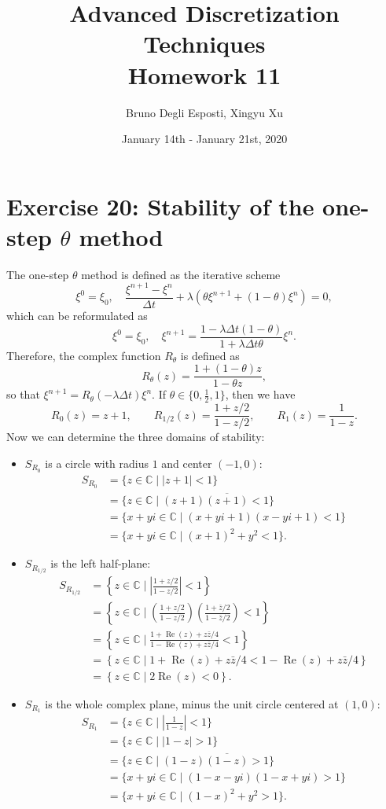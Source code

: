 \documentclass[a4paper]{article}
\title{\huge{Advanced Discretization Techniques \\ Homework 11}}
\author{\Large{Bruno Degli Esposti, Xingyu Xu}}
\date{January 14th - January 21st, 2020}
\newcommand{\abs}[1]{\left\lvert #1 \right\rvert}
\newcommand{\C}{\mathbb{C}}
\renewcommand{\Re}{\operatorname{Re}}
\begin{document}
\maketitle

\section*{Exercise 20: Stability of the one-step $\theta$ method}
The one-step $\theta$ method is defined as the iterative scheme
\[
\xi^0 = \xi_0, \quad
\frac{\xi^{n+1}-\xi^n}{\Delta t} + \lambda(\theta\xi^{n+1}+(1-\theta)\xi^n) = 0,
\]
which can be reformulated as
\[
\xi^0 = \xi_0, \quad
\xi^{n+1} = \frac{1-\lambda\Delta t(1-\theta)}{1+\lambda\Delta t\theta}\xi^n.
\]
Therefore, the complex function $R_\theta$ is defined as
\[
R_\theta(z)=\frac{1+(1-\theta)z}{1-\theta z},
\]
so that $\xi^{n+1} = R_\theta(-\lambda \Delta t) \xi^n$.
If $\theta \in \{0,\frac{1}{2},1\}$, then we have
\[
R_0(z) = z+1,
\qquad R_{1/2}(z) = \frac{1+z/2}{1-z/2},
\qquad R_1(z) = \frac{1}{1-z}.
\]
Now we can determine the three domains of stability:
\begin{itemize}
\item $S_{R_0}$ is a circle with radius $1$ and center $(-1,0)$:
\begin{align*}
S_{R_0}
&	= \{ z \in \C \mid \abs{z+1} < 1 \} \\
&	= \{ z \in \C \mid (z+1)\overline{(z+1)} < 1 \} \\
&	= \{ x+yi \in \C \mid (x+yi+1)(x-yi+1) < 1 \} \\
&	= \{ x+yi \in \C \mid (x+1)^2 + y^2 < 1 \}.
\end{align*}
\item $S_{R_{1/2}}$ is the left half-plane:
\begin{align*}
S_{R_{1/2}}
&	= \left\{ z \in \C \mid \abs{\frac{1+z/2}{1-z/2}} < 1 \right\} \\
&	= \left\{ z \in \C \mid \left(\frac{1+z/2}{1-z/2}\right)
                            \left(\frac{1+\bar{z}/2}{1-\bar{z}/2}\right) < 1 \right\} \\
&	= \left\{ z \in \C \mid \frac{1+\Re(z)+z\bar{z}/4}{1-\Re(z)+z\bar{z}/4} < 1 \right\} \\
&	= \left\{ z \in \C \mid 1+\Re(z)+z\bar{z}/4 < 1-\Re(z)+z\bar{z}/4 \right\} \\
&	= \left\{ z \in \C \mid 2\Re(z) < 0 \right\}.
\end{align*}
\item $S_{R_1}$ is the whole complex plane, minus the unit circle centered at $(1,0)$:
\begin{align*}
S_{R_1}
&	= \{ z \in \C \mid \abs{\frac{1}{1-z}} < 1 \} \\
&	= \{ z \in \C \mid \abs{1-z} > 1 \} \\
&	= \{ z \in \C \mid (1-z)\overline{(1-z)} > 1 \} \\
&	= \{ x+yi \in \C \mid (1-x-yi)(1-x+yi) > 1 \} \\
&	= \{ x+yi \in \C \mid (1-x)^2 + y^2 > 1 \}.
\end{align*}
\end{itemize}
\end{document}
